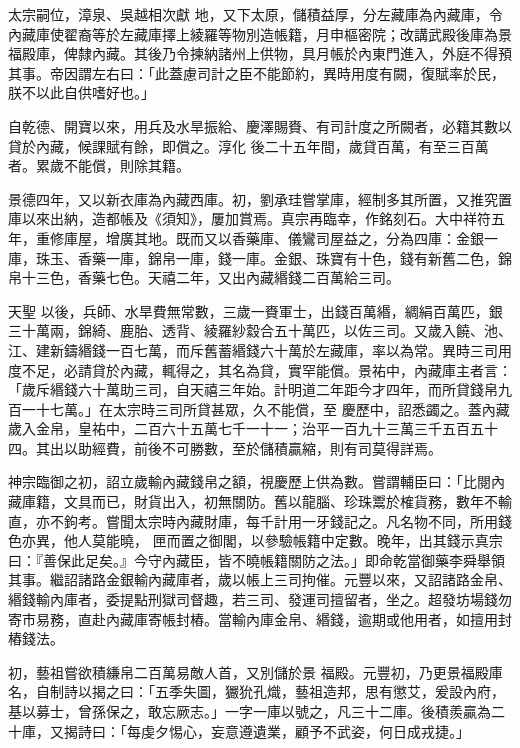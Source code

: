 \begin{pinyinscope}
 太宗嗣位，漳泉、吳越相次獻
 地，又下太原，儲積益厚，分左藏庫為內藏庫，令內藏庫使翟裔等於左藏庫擇上綾羅等物別造帳籍，月申樞密院；改講武殿後庫為景福殿庫，俾隸內藏。其後乃令揀納諸州上供物，具月帳於內東門進入，外庭不得預其事。帝因謂左右曰：「此蓋慮司計之臣不能節約，異時用度有闕，復賦率於民，朕不以此自供嗜好也。」



 自乾德、開寶以來，用兵及水旱振給、慶澤賜賚、有司計度之所闕者，必籍其數以貸於內藏，候課賦有餘，即償之。淳化
 後二十五年間，歲貸百萬，有至三百萬者。累歲不能償，則除其籍。



 景德四年，又以新衣庫為內藏西庫。初，劉承珪嘗掌庫，經制多其所置，又推究置庫以來出納，造都帳及《須知》，屢加賞焉。真宗再臨幸，作銘刻石。大中祥符五年，重修庫屋，增廣其地。既而又以香藥庫、儀鸞司屋益之，分為四庫：金銀一庫，珠玉、香藥一庫，錦帛一庫，錢一庫。金銀、珠寶有十色，錢有新舊二色，錦帛十三色，香藥七色。天禧二年，又出內藏緡錢二百萬給三司。



 天聖
 以後，兵師、水旱費無常數，三歲一賚軍士，出錢百萬緡，綢絹百萬匹，銀三十萬兩，錦綺、鹿胎、透背、綾羅紗縠合五十萬匹，以佐三司。又歲入饒、池、江、建新鑄緡錢一百七萬，而斥舊蓄緡錢六十萬於左藏庫，率以為常。異時三司用度不足，必請貸於內藏，輒得之，其名為貸，實罕能償。景祐中，內藏庫主者言：「歲斥緡錢六十萬助三司，自天禧三年始。計明道二年距今才四年，而所貸錢帛九百一十七萬。」在太宗時三司所貸甚眾，久不能償，至
 慶歷中，詔悉蠲之。蓋內藏歲入金帛，皇祐中，二百六十五萬七千一十一；治平一百九十三萬三千五百五十四。其出以助經費，前後不可勝數，至於儲積贏縮，則有司莫得詳焉。



 神宗臨御之初，詔立歲輸內藏錢帛之額，視慶歷上供為數。嘗謂輔臣曰：「比閱內藏庫籍，文具而已，財貨出入，初無關防。舊以龍腦、珍珠鬻於榷貨務，數年不輸直，亦不鉤考。嘗聞太宗時內藏財庫，每千計用一牙錢記之。凡名物不同，所用錢色亦異，他人莫能曉，
 匣而置之御閣，以參驗帳籍中定數。晚年，出其錢示真宗曰：『善保此足矣。』今守內藏臣，皆不曉帳籍關防之法。」即命乾當御藥李舜舉領其事。繼詔諸路金銀輸內藏庫者，歲以帳上三司拘催。元豐以來，又詔諸路金帛、緡錢輸內庫者，委提點刑獄司督趣，若三司、發運司擅留者，坐之。超發坊場錢勿寄市易務，直赴內藏庫寄帳封樁。當輸內庫金帛、緡錢，逾期或他用者，如擅用封樁錢法。



 初，藝祖嘗欲積縑帛二百萬易敵人首，又別儲於景
 福殿。元豐初，乃更景福殿庫名，自制詩以揭之曰：「五季失圖，玁狁孔熾，藝祖造邦，思有懲艾，爰設內府，基以募士，曾孫保之，敢忘厥志。」一字一庫以號之，凡三十二庫。後積羨贏為二十庫，又揭詩曰：「每虔夕惕心，妄意遵遺業，顧予不武姿，何日成戎捷。」




\end{pinyinscope}
